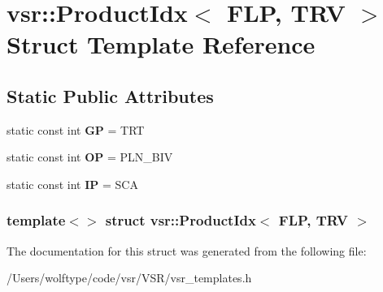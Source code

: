 \hypertarget{structvsr_1_1_product_idx_3_01_f_l_p_00_01_t_r_v_01_4}{\section{vsr\-:\-:Product\-Idx$<$ F\-L\-P, T\-R\-V $>$ Struct Template Reference}
\label{structvsr_1_1_product_idx_3_01_f_l_p_00_01_t_r_v_01_4}
}
\subsection*{Static Public Attributes}
\begin{DoxyCompactItemize}
\item 
\hypertarget{structvsr_1_1_product_idx_3_01_f_l_p_00_01_t_r_v_01_4_a41cca00aae1c3dd93dfb6e28179db7b1}{static const int {\bfseries G\-P} = T\-R\-T}\label{structvsr_1_1_product_idx_3_01_f_l_p_00_01_t_r_v_01_4_a41cca00aae1c3dd93dfb6e28179db7b1}

\item 
\hypertarget{structvsr_1_1_product_idx_3_01_f_l_p_00_01_t_r_v_01_4_a1e86c84b87e8eba6b343d5ccd9679002}{static const int {\bfseries O\-P} = P\-L\-N\-\_\-\-B\-I\-V}\label{structvsr_1_1_product_idx_3_01_f_l_p_00_01_t_r_v_01_4_a1e86c84b87e8eba6b343d5ccd9679002}

\item 
\hypertarget{structvsr_1_1_product_idx_3_01_f_l_p_00_01_t_r_v_01_4_a609f0bb96865a88ae4b4b161f385bcaf}{static const int {\bfseries I\-P} = S\-C\-A}\label{structvsr_1_1_product_idx_3_01_f_l_p_00_01_t_r_v_01_4_a609f0bb96865a88ae4b4b161f385bcaf}

\end{DoxyCompactItemize}
\subsubsection*{template$<$$>$ struct vsr\-::\-Product\-Idx$<$ F\-L\-P, T\-R\-V $>$}



The documentation for this struct was generated from the following file\-:\begin{DoxyCompactItemize}
\item 
/\-Users/wolftype/code/vsr/\-V\-S\-R/vsr\-\_\-templates.\-h\end{DoxyCompactItemize}
